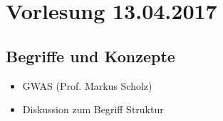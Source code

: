 \section{Vorlesung 13.04.2017}

\subsection{Begriffe und Konzepte}
\begin{itemize}
	\item GWAS (Prof. Markus Scholz)
	\item Diskussion zum Begriff Struktur
\end{itemize}